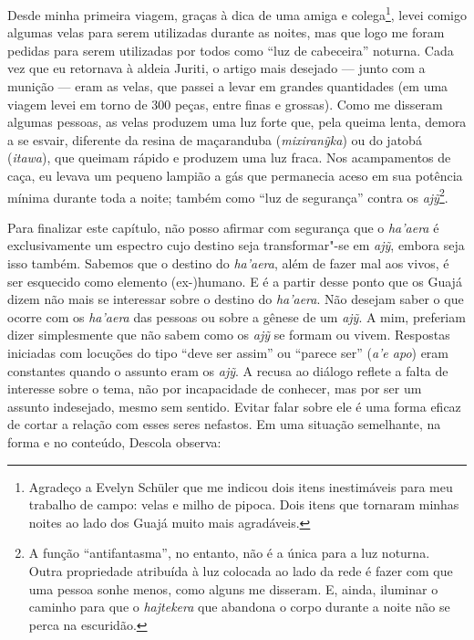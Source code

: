 Desde minha primeira viagem, graças à dica de uma amiga e
colega\footnote{Agradeço a Evelyn Schüler que me indicou dois itens
  inestimáveis para meu trabalho de campo: velas e milho de pipoca. Dois
  itens que tornaram minhas noites ao lado dos Guajá muito mais
  agradáveis.}, levei comigo algumas velas para serem utilizadas durante
as noites, mas que logo me foram pedidas para serem utilizadas por todos
como ``luz de cabeceira'' noturna. Cada vez que eu retornava à aldeia
Juriti, o artigo mais desejado --- junto com a munição --- eram as velas,
que passei a levar em grandes quantidades (em uma viagem levei em torno
de 300 peças, entre finas e grossas). Como me disseram algumas pessoas,
as velas produzem uma luz forte que, pela queima lenta, demora a se
esvair, diferente da resina de maçaranduba (\emph{mixiranỹka}) ou do
jatobá (\emph{itawa}), que queimam rápido e produzem uma luz fraca. Nos
acampamentos de caça, eu levava um pequeno lampião a gás que permanecia
aceso em sua potência mínima durante toda a noite; também como ``luz de
segurança'' contra os \emph{ajỹ}\footnote{A função ``antifantasma'', no
  entanto, não é a única para a luz noturna. Outra propriedade atribuída
  à luz colocada ao lado da rede é fazer com que uma pessoa sonhe menos,
  como alguns me disseram. E, ainda, iluminar o caminho para que o
  \emph{hajtekera} que abandona o corpo durante a noite não se perca na
  escuridão.}.

\asterisc

Para finalizar este capítulo, não posso afirmar com segurança que o
\emph{ha'aera} é exclusivamente um espectro cujo destino seja
transformar"-se em \emph{ajỹ}, embora seja isso também. Sabemos que o
destino do \emph{ha'aera}, além de fazer mal aos vivos, é ser esquecido
como elemento (ex-)humano. E é a partir desse ponto que os Guajá dizem
não mais se interessar sobre o destino do \emph{ha'aera}. Não desejam
saber o que ocorre com os \emph{ha'aera} das pessoas ou sobre a gênese
de um \emph{ajỹ}. A mim, preferiam dizer simplesmente que não sabem como
os \emph{ajỹ} se formam ou vivem. Respostas iniciadas com locuções do
tipo ``deve ser assim'' ou ``parece ser'' (\emph{a'e apo}) eram constantes
quando o assunto eram os \emph{ajỹ}. A recusa ao diálogo reflete a falta
de interesse sobre o tema, não por incapacidade de conhecer, mas por ser
um assunto indesejado, mesmo sem sentido. Evitar falar sobre ele é uma
forma eficaz de cortar a relação com esses seres nefastos. Em uma
situação semelhante, na forma e no conteúdo, Descola observa:

